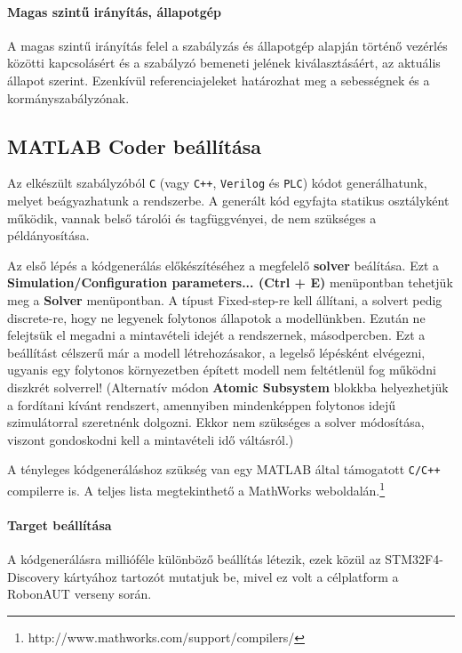 \paragraph{Magas szintű irányítás, állapotgép}

A magas szintű irányítás felel a szabályzás és állapotgép alapján történő vezérlés közötti kapcsolásért és a szabályzó bemeneti jelének kiválasztásáért, az aktuális állapot szerint. Ezenkívül referenciajeleket határozhat meg a sebességnek és a kormányszabályzónak.

\subsection{MATLAB Coder beállítása}

Az elkészült szabályzóból \verb!C! (vagy \verb!C++!, \verb!Verilog! és \verb!PLC!) kódot generálhatunk, melyet beágyazhatunk a rendszerbe. A generált kód egyfajta statikus osztályként működik, vannak belső tárolói és tagfüggvényei, de nem szükséges a példányosítása.

Az első lépés a kódgenerálás előkészítéséhez a megfelelő \textbf{solver} beálítása. Ezt a \textbf{Simulation/Configuration parameters... (Ctrl + E)} menüpontban tehetjük meg a \textbf{Solver} menüpontban. A típust Fixed-step-re kell állítani, a solvert pedig discrete-re, hogy ne legyenek folytonos állapotok a modellünkben. Ezután ne felejtsük el megadni a mintavételi idejét a rendszernek, másodpercben.
Ezt a beállítást célszerű már a modell létrehozásakor, a legelső lépésként elvégezni, ugyanis egy folytonos környezetben épített modell nem feltétlenül fog működni diszkrét solverrel! (Alternatív módon \textbf{Atomic Subsystem} blokkba helyezhetjük a fordítani kívánt rendszert, amennyiben mindenképpen folytonos idejű szimulátorral szeretnénk dolgozni. Ekkor nem szükséges a solver módosítása, viszont gondoskodni kell a mintavételi idő váltásról.)

A tényleges kódgeneráláshoz szükség van egy MATLAB által támogatott \verb!C/C++! compilerre is. A teljes lista megtekinthető a MathWorks weboldalán.\footnote{http://www.mathworks.com/support/compilers/}

\paragraph{Target beállítása}

A kódgenerálásra millióféle különböző beállítás létezik, ezek közül az STM32F4-Discovery kártyához tartozót mutatjuk be, mivel ez volt a célplatform a RobonAUT verseny során.

